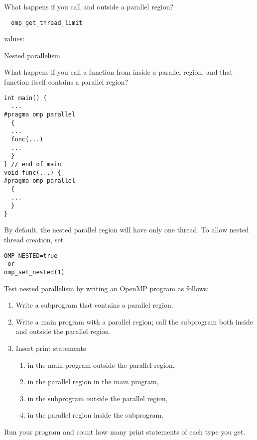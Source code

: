\begin{exercise}
  What happens if you call  and 
  outside a parallel region?
\end{exercise}

\begin{verbatim}
  omp_get_thread_limit
\end{verbatim}

 values: 

 {Nested parallelism}

What happens if you call a function from inside a parallel region, and
that function itself contains a parallel region?
\begin{verbatim}
int main() {
  ...
#pragma omp parallel
  {
  ...
  func(...)
  ...
  }
} // end of main
void func(...) {
#pragma omp parallel
  {
  ...
  }
}
\end{verbatim}

By default, the nested parallel region will have only one thread. To
allow nested thread creation, set
\begin{verbatim}
OMP_NESTED=true
 or
omp_set_nested(1)
\end{verbatim}

\begin{exercise}
  Test nested parallelism by writing an OpenMP program as follows:
  \begin{enumerate}
  \item Write a subprogram that contains a parallel region.
  \item\label{ex:nest:sub} Write a main program with a parallel region; call the subprogram both inside and outside the parallel region.
    \item Insert print statements 
      \begin{enumerate}
      \item in the main program outside the parallel region,
      \item in the parallel region in the main program,
      \item\label{ex:nest:sub:sub} in the subprogram outside the parallel region,
      \item in the parallel region inside the subprogram.
      \end{enumerate}
  \end{enumerate}
  Run your program and count how many print statements of each type you get.
\end{exercise}

